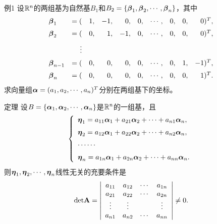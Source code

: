 \begin{frame}
  \begin{footnotesize}
    \begin{exampleblock}{例1}
      设$\mathbb{R}^n$的两组基为自然基$B_1$和$B_2=\{\boldsymbol{\beta}_1,\boldsymbol{\beta}_2,\cdots,\boldsymbol{\beta}_n\}$，其中
      \begin{equation}\label{twobase}
      \begin{array}{lrrrrrrrrr}
        \boldsymbol{\beta}_1&=(&1,&-1,& 0,&0,&\cdots,&0,&0,&0)^T,\\[0.2cm]
        \boldsymbol{\beta}_2&=(&0,& 1,&-1,&0,&\cdots,&0,&0,&0)^T,\\[0.2cm]
        &\vdots&&&&&\\[0.2cm]
        \boldsymbol{\beta}_{n-1}&=(&0,&0,&0,&0,&\cdots,&0,&1,&-1)^T,\\[0.2cm]
        \boldsymbol{\beta}_{n}&=(&0,&0,&0,&0,&\cdots,&0,&0,&1)^T.
      \end{array}
      \end{equation}
      求向量组$\boldsymbol{\alpha}=(a_1,a_2,\cdots,a_n)^T$分别在两组基下的坐标。
    \end{exampleblock}
  \end{footnotesize}
\end{frame}


\begin{frame}
  \begin{footnotesize}
    \begin{block}{定理}
      设$B=\{\boldsymbol{\alpha}_1,\boldsymbol{\alpha}_2,\cdots,\boldsymbol{\alpha}_n\}$是$\mathbb{R}^n$的一组基，且
      $$
      \left\{
      \begin{array}{l}
        \boldsymbol{\eta}_1=a_{11}\boldsymbol{\alpha}_1+a_{21}\boldsymbol{\alpha}_2+\cdots+a_{n1}\boldsymbol{\alpha}_n,\\[0.2cm]
        \boldsymbol{\eta}_2=a_{12}\boldsymbol{\alpha}_1+a_{22}\boldsymbol{\alpha}_2+\cdots+a_{n2}\boldsymbol{\alpha}_n,\\[0.2cm]
        \cdots\cdots\\[0.2cm]
        \boldsymbol{\eta}_n=a_{1n}\boldsymbol{\alpha}_1+a_{2n}\boldsymbol{\alpha}_2+\cdots+a_{nn}\boldsymbol{\alpha}_n.
      \end{array}
      \right.
      $$
      则$\boldsymbol{\eta}_1,\boldsymbol{\eta}_2,\cdots,\boldsymbol{\eta}_n$线性无关的充要条件是
      $$
      \mathrm{det}\mathbf{A}=\left|
      \begin{array}{cccc}
        a_{11}&a_{12}&\cdots&a_{1n}\\
        a_{21}&a_{22}&\cdots&a_{2n}\\
        \vdots&\vdots&&\vdots\\
        a_{n1}&a_{n2}&\cdots&a_{nn}
      \end{array}
      \right|\ne 0.
      $$
    \end{block}
  \end{footnotesize}
\end{frame}


